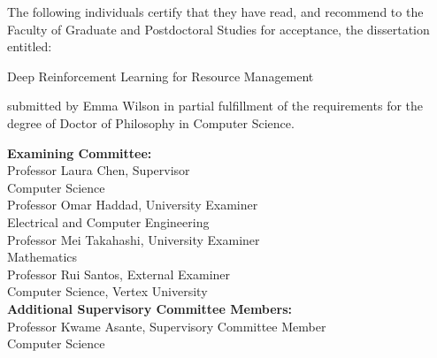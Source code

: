 \begin{singlespace}
\noindent The following individuals certify that they have read, and recommend to the Faculty of
Graduate and Postdoctoral Studies for acceptance, the dissertation entitled:\par
\vspace{0.8em}
\begin{center}Deep Reinforcement Learning for Resource Management\end{center}
\noindent submitted by Emma Wilson in partial fulfillment of the requirements for the degree
of Doctor of Philosophy in Computer Science.\par
\vspace{1.5em}
\noindent\textbf{Examining Committee:}\\[0.4em]
Professor Laura Chen, Supervisor\\
Computer Science\\[0.6em]
Professor Omar Haddad, University Examiner\\
Electrical and Computer Engineering\\[0.6em]
Professor Mei Takahashi, University Examiner\\
Mathematics\\[0.6em]
Professor Rui Santos, External Examiner\\
Computer Science, Vertex University\\[0.6em]
\vspace{1em}
\noindent\textbf{Additional Supervisory Committee Members:}\\[0.4em]
Professor Kwame Asante, Supervisory Committee Member\\
Computer Science\\[0.6em]
\end{singlespace}
\clearpage

